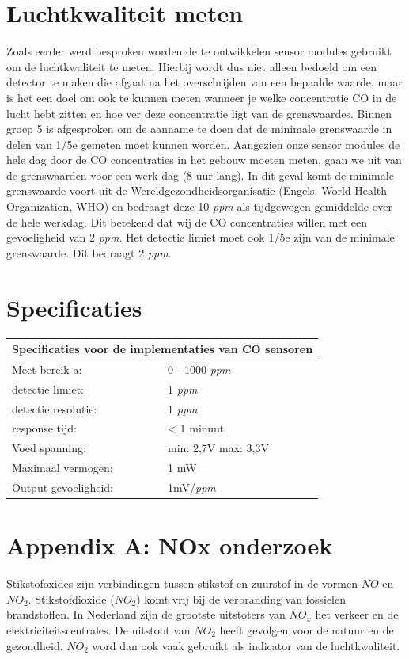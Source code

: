 \documentclass[a4paper, 11pt]{article} %
\begin{document}
\section{Luchtkwaliteit meten}
Zoals eerder werd besproken worden de te ontwikkelen sensor modules gebruikt om de luchtkwaliteit te meten. Hierbij wordt dus niet alleen bedoeld om een detector te maken die afgaat na het overschrijden van een bepaalde waarde, maar is het een doel om ook te kunnen meten wanneer je welke concentratie CO in de lucht hebt zitten en hoe ver deze concentratie ligt van de grenswaardes. Binnen groep 5 is afgesproken om de aanname te doen dat de minimale grenswaarde in delen van 1/5e gemeten moet kunnen worden. Aangezien onze sensor modules de hele dag door de CO concentraties in het gebouw moeten meten, gaan we uit van de grenswaarden voor een werk dag (8 uur lang). In dit geval komt de minimale grenswaarde voort uit de Wereldgezondheidsorganisatie (Engels: World Health Organization, WHO) en bedraagt deze 10 \textit{ppm} als tijdgewogen gemiddelde over de hele werkdag. Dit betekend dat wij de CO concentraties willen met een gevoeligheid van 2 \textit{ppm}. Het detectie limiet moet ook 1/5e zijn van de minimale grenswaarde. Dit bedraagt 2 \textit{ppm}.

\section{Specificaties}
\begin{center}
	\begin{tabular}{ | m{5cm} | m{5cm}| } 
		\hline
		\multicolumn{2}{|c|}{Specificaties voor de implementaties van CO sensoren} \\
		\hline
		Meet bereik a: & 0 - 1000 \textit{ppm} \\
		\hline
		detectie limiet:  & 1 \textit{ppm}
		\\ 
		\hline
		detectie resolutie: & 1 \textit{ppm} 
		\\ 
		\hline
		response tijd: & < 1 minuut
		\\ 
		\hline
		Voed spanning: & min: 2,7V max: 3,3V
		\\ 
		\hline
		Maximaal vermogen: & 1 mW
		\\
		\hline
		Output gevoeligheid: & 1mV/\textit{ppm}
		\\
		\hline
	\end{tabular}
\end{center}

\newpage
\appendix
\section{Appendix A: NOx onderzoek}
Stikstofoxides zijn verbindingen tussen stikstof en zuurstof in de vormen $NO$ en $NO_2$. Stikstofdioxide ($NO_2$) komt vrij bij de verbranding van fossielen brandstoffen. In Nederland zijn de grootste uitstoters van $NO_x$ het verkeer en de elektriciteitscentrales.  De uitstoot van $NO_2$ heeft gevolgen voor de natuur en de gezondheid. $NO_2$ word dan ook vaak gebruikt als indicator van de luchtkwaliteit.
\end{document}
